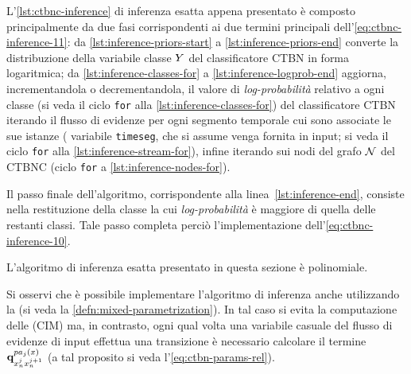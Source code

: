 L'\autoref{lst:ctbnc-inference} di inferenza esatta appena presentato è composto principalmente da due fasi corrispondenti ai due termini principali dell'\autoref{eq:ctbnc-inference-11}: da \autoref{lst:inference-priors-start} a \autoref{lst:inference-priors-end} converte la distribuzione della variabile classe $\mathnormal{Y}$ del classificatore \acs{CTBN} in forma logaritmica; da \autoref{lst:inference-classes-for} a \autoref{lst:inference-logprob-end} aggiorna, incrementandola o decrementandola, il valore di \emph{log-probabilità} relativo a ogni classe (si veda il ciclo \lstinline[]|for| alla \autoref{lst:inference-classes-for}) del classificatore \acs{CTBN} iterando il flusso di evidenze per ogni segmento temporale cui sono associate le sue istanze (\ie{} variabile \lstinline[]|timeseg|, che si assume venga fornita in input; si veda il ciclo \lstinline[]|for| alla \autoref{lst:inference-stream-for}), infine iterando sui nodi del grafo $\mathcal{N}$ del \acs{CTBNC} (ciclo \lstinline[]|for| a \autoref{lst:inference-nodes-for}).

Il passo finale dell'algoritmo, corrispondente alla linea~\autoref{lst:inference-end}, consiste nella restituzione della classe la cui \emph{log-probabilità} è maggiore di quella delle restanti classi. Tale passo completa perciò l'implementazione dell'\autoref{eq:ctbnc-inference-10}.

L'algoritmo di inferenza esatta presentato in questa sezione è polinomiale.

\begin{nota}
Si osservi che è possibile implementare l'algoritmo di inferenza anche utilizzando la \emph{} (si veda la \autoref{defn:mixed-parametrization}). In tal caso si evita la computazione delle \cim{} (\acs{CIM}) ma, in contrasto, ogni qual volta una variabile casuale del flusso di evidenze di input effettua una transizione è necessario calcolare il termine $\boldsymbol{\textbf{\text{q}}}_{\mathnormal{x}_n^j\mathnormal{x}_n^{j+1}}^{pa_j(\mathnormal{x})}$ (a tal proposito si veda l'\autoref{eq:ctbn-params-rel}).%
\end{nota}

